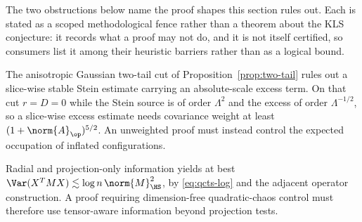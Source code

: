 \documentclass[../../main.tex]{subfiles}
\begin{document}
The two obstructions below name the proof shapes this section rules out. Each is stated as a
scoped methodological fence rather than a theorem about the KLS conjecture: it records what a proof may
not do, and it is not itself certified, so consumers list it among their heuristic barriers rather
than as a logical bound.

\begin{obstruction}
\label{obs:two-tail}
The anisotropic Gaussian two-tail cut of Proposition~\ref{prop:two-tail} rules out a slice-wise
stable Stein estimate carrying an absolute-scale excess term. On that cut \(r=D=0\) while the
Stein source is of order \(\Lambda^{2}\) and the excess of order \(\Lambda^{-1/2}\), so a
slice-wise excess estimate needs covariance weight at least
\((1+\norm{A}_{\op})^{5/2}\). An unweighted proof must instead control the expected occupation of
inflated configurations.
\end{obstruction}

\begin{obstruction}
\label{obs:proj-ceiling}
Radial and projection-only information yields at best
\(\Var(X^{T}MX)\lesssim\log n\,\norm{M}_{\HS}^{2}\), by \eqref{eq:qcts-log} and the adjacent
operator construction. A proof requiring dimension-free quadratic-chaos control must therefore use
tensor-aware information beyond projection tests.
\end{obstruction}
\end{document}
